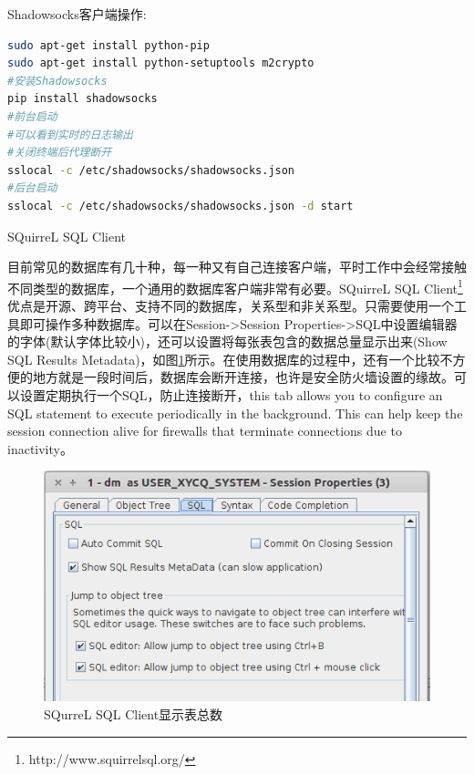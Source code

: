 \documentclass[12pt]{book}
\makeatletter
\numberwithin{dummy}{section}
\theoremstyle{ocrenumbox}
\theoremstyle{blacknumex}
\theoremstyle{blacknumbox}
\theoremstyle{ocrenum}
\renewcommand{\subsection}{\@startsection {subsection}{2}{\z@}
	{-3ex \@plus -0.1ex \@minus -.4ex}
	{0.5ex \@plus.2ex }
	{\normalfont\sffamily\bfseries}}
\makeatother
\begin{document}
Shadowsocks客户端操作:

\begin{lstlisting}[language=Bash]
sudo apt-get install python-pip
sudo apt-get install python-setuptools m2crypto
#安装Shadowsocks
pip install shadowsocks
#前台启动
#可以看到实时的日志输出
#关闭终端后代理断开
sslocal -c /etc/shadowsocks/shadowsocks.json
#后台启动
sslocal -c /etc/shadowsocks/shadowsocks.json -d start
\end{lstlisting}





\subsection{SQuirreL SQL Client}

目前常见的数据库有几十种，每一种又有自己连接客户端，平时工作中会经常接触不同类型的数据库，一个通用的数据库客户端非常有必要。SQuirreL SQL Client\footnote{http://www.squirrelsql.org/}优点是开源、跨平台、支持不同的数据库，关系型和非关系型。只需要使用一个工具即可操作多种数据库。可以在Session->Session Properties->SQL中设置编辑器的字体(默认字体比较小)，还可以设置将每张表包含的数据总量显示出来(Show SQL Results Metadata)，如图\ref{fig:showtableresultcount}所示。在使用数据库的过程中，还有一个比较不方便的地方就是一段时间后，数据库会断开连接，也许是安全防火墙设置的缘故。可以设置定期执行一个SQL，防止连接断开，this tab allows you to configure an SQL statement to execute periodically in the background. This can help keep the session connection alive for firewalls that terminate connections due to inactivity。

\begin{figure}[htbp]
	\centering
	\includegraphics[scale=0.4]{showtableresultcount.png}
	\caption{SQurreL SQL Client显示表总数}
	\label{fig:showtableresultcount}
\end{figure}
\end{document}
